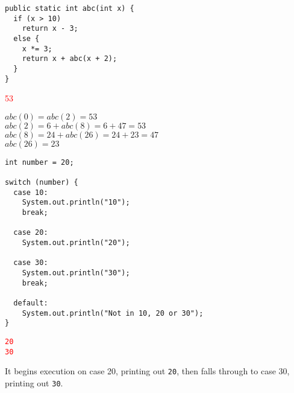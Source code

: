 \documentclass[11pt,addpoints]{exam}
\begin{document}
\begin{questions}
\begin{minipage}{\textwidth}


\begin{verbatim}
public static int abc(int x) {
  if (x > 10)
    return x - 3;
  else {
    x *= 3;
    return x + abc(x + 2);
  }
}
\end{verbatim}

\begin{choices}
  \choice \textcolor{red}{53}
   \\
\end{choices}

$abc(0) = abc(2) = 53$ \\
$abc(2) = 6 + abc(8) = 6 + 47 = 53$ \\
$abc(8) = 24 + abc(26) = 24 + 23 = 47$ \\
$abc(26) = 23$ \\

\end{minipage}

\begin{minipage}{\textwidth}

\begin{verbatim}
int number = 20;

switch (number) {
  case 10:
    System.out.println("10");
    break;

  case 20:
    System.out.println("20");

  case 30:
    System.out.println("30");
    break;

  default:
    System.out.println("Not in 10, 20 or 30");
}
\end{verbatim}

\begin{choices}
  \choice \textcolor{red}{\tt 20\\30}
   \\
\end{choices}

It begins execution on case 20, printing out {\tt 20}, then falls through to case 30, printing out {\tt 30}. \\

\end{minipage}

\begin{minipage}{\textwidth}


\end{minipage}
\end{questions}
\end{document}
